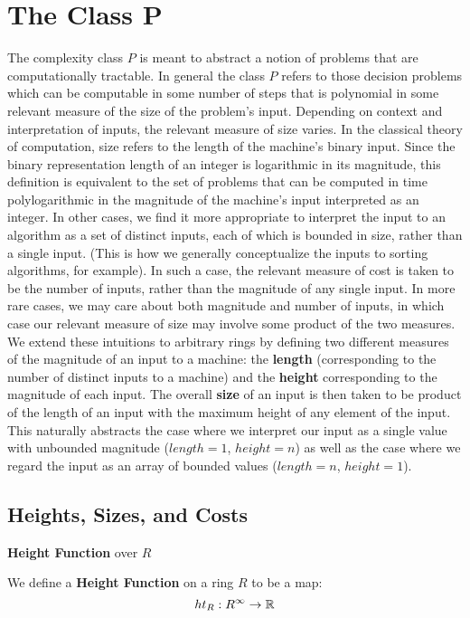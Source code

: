   \section{The Class P}

The complexity class $P$ is meant to abstract a notion of problems
that are computationally tractable.  In general the class $P$ refers
to those decision problems which can be computable in some number of
steps that is polynomial in some relevant measure of the size of the
problem's input.  Depending on context and interpretation of inputs,
the relevant measure of size varies. In the classical theory of
computation, size refers to the length of the machine's binary input.
Since the binary representation length of an integer is logarithmic in
its magnitude, this definition is equivalent to the set of problems
that can be computed in time polylogarithmic in the magnitude of the
machine's input interpreted as an integer.  In other cases, we find it
more appropriate to interpret the input to an algorithm as a set of
distinct inputs, each of which is bounded in size, rather than a
single input.  (This is how we generally conceptualize the inputs to
sorting algorithms, for example).  In such a case, the relevant
measure of cost is taken to be the number of inputs, rather than the
magnitude of any single input.  In more rare cases, we may care about
both magnitude and number of inputs, in which case our relevant measure
of size may involve some product of the two measures.\\

We extend these intuitions to arbitrary rings by defining two
different measures of the magnitude of an input to a machine: the
\textbf{length} (corresponding to the number of distinct inputs to a
machine) and the \textbf{height} corresponding to the magnitude of
each input.  The overall \textbf{size} of an input is then taken to be
product of the length of an input with the maximum height of any
element of the input.  This naturally abstracts the case where we
interpret our input as a single value with unbounded magnitude
($length = 1$, $height = n$) as well as the case where we regard the
input as an array of bounded values ($length = n$, $height = 1$).

\subsection{Heights, Sizes,  and Costs}

\begin{definition}{\textbf{Height Function} over $R$}

  We define a \textbf{Height Function} on a ring $R$ to be a map:
  $$ht_R:R^\infty \rightarrow \mathbb{R}$$
\end{definition}

